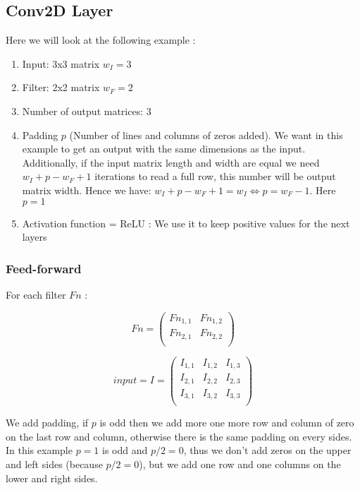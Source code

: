 \documentclass[11pt,a4paper]{report}
\begin{document}
\subsection{Conv2D Layer}
Here we will look at the following example :
\begin{enumerate}
    \item Input: 3x3 matrix $w_I = 3$
    \item Filter: 2x2 matrix $w_F = 2$
    \item Number of output matrices: 3
    \item Padding $p$ (Number of lines and columns of zeros added). We want in this example to get an output with the same dimensions as the input. Additionally, if the input matrix length and width are equal we need $w_I + p - w_F + 1$ iterations to read a full row, this number will be output matrix width. Hence we have: $w_I + p - w_F + 1 = w_I \Leftrightarrow p = w_F - 1$. Here $p = 1$
    \item Activation function = ReLU : We use it to keep positive values for the next layers
\end{enumerate}
\subsubsection{Feed-forward}

For each filter $Fn$ :

\begin{equation}
Fn = \begin{pmatrix}
Fn_{1,1} & Fn_{1,2} \\
Fn_{2,1} & Fn_{2,2} \\
\end{pmatrix}
\end{equation}

\begin{equation}
input = I = \begin{pmatrix}
I_{1,1} & I_{1,2} & I_{1,3} \\
I_{2,1} & I_{2,2} & I_{2,3} \\
I_{3,1} & I_{3,2} & I_{3,3} \\
\end{pmatrix}
\end{equation}

We add padding, if $p$ is odd then we add more one more row and column of zero on the last row and column, otherwise there is the same padding on every sides. In this example $p = 1$ is odd and $p/2 = 0$, thus we don't add zeros on the upper and left sides (because $p/2 = 0$), but we add one row and one columns on the lower and right sides.
\end{document}
